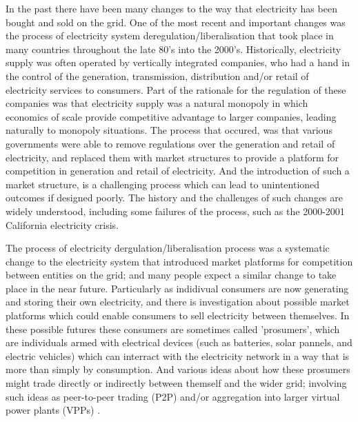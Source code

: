 In the past there have been many changes to the way that electricity has been bought and sold on the grid.
One of the most recent and important changes was the process of electricity system deregulation/liberalisation that took place in many countries throughout the late 80's into the 2000's.
Historically, electricity supply was often operated by vertically integrated companies, who had a hand in the control of the generation, transmission, distribution and/or retail of electricity services to consumers.
Part of the rationale for the regulation of these companies was that electricity supply was a natural monopoly in which economics of scale provide competitive advantage to larger companies, leading naturally to monopoly situations.
The process that occured, was that various governments were able to remove regulations over the generation and retail of electricity, and replaced them with market structures to provide a platform for competition in generation and retail of electricity.
And the introduction of such a market structure, is a challenging process which can lead to unintentioned outcomes if designed poorly.
The history and the challenges of such changes are widely understood, including some failures of the process, such as the 2000-2001 California electricity crisis. \cite{griffin2009electricity}

The process of electricity dergulation/liberalisation process was a systematic change to the electricity system that introduced market platforms for competition between entities on the grid; and many people expect a similar change to take place in the near future.
Particularly as indidivual consumers are now generating and storing their own electricity, and there is investigation about possible market platforms which could enable consumers to sell electricity between themselves.
In these possible futures these consumers are sometimes called 'prosumers', which are individuals armed with electrical devices (such as batteries, solar pannels, and electric vehicles) which can interract with the electricity network in a way that is more than simply by consumption.
And various ideas about how these prosumers might trade directly or indirectly between themself and the wider grid; involving such ideas as peer-to-peer trading (P2P) and/or aggregation into larger virtual power plants (VPPs) \cite{Morstyn2018}.

